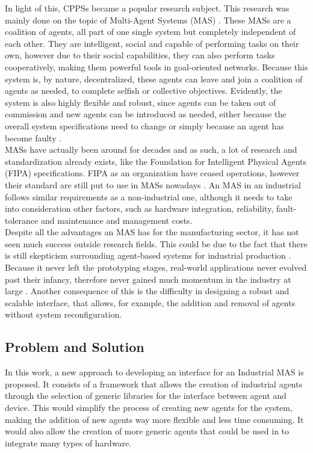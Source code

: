 In light of this, CPPSs became a popular research subject. This research was mainly done on the topic of Multi-Agent Systems (MAS) \cite{sakurada01} \cite{karnouskos01}. These MASs are a coalition of agents, all part of one single system but completely independent of each other. They are intelligent, social and capable of performing tasks on their own, however due to their social capabilities, they can also perform tasks cooperatively, making them powerful tools in goal-oriented networks. Because this system is, by nature, decentralized, these agents can leave and join a coalition of agents as needed, to complete selfish or collective objectives. Evidently, the system is also highly flexible and robust, since agents can be taken out of commission and new agents can be introduced as needed, either because the overall system specifications need to change or simply because an agent has become faulty \cite{paulo02}. \\

MASs have actually been around for decades and as such, a lot of research and standardization already exists, like the Foundation for Intelligent Physical Agents (FIPA) specifications. FIPA as an organization have ceased operations, however their standard are still put to use in MASs nowadays \cite{FIPA_website}. An MAS in an industrial follows similar requirements as a non-industrial one, although it needs to take into consideration other factors, such as hardware integration, reliability, fault-tolerance and maintenance and management costs.\\

Despite all the advantages an MAS has for the manufacturing sector, it has not seen much success outside research fields. This could be due to the fact that there is still skepticism surrounding agent-based systems for industrial production \cite{bottling_plant_part2}. Because it never left the prototyping stages, real-world applications never evolved past their infancy, therefore never gained much momentum in the industry at large \cite{karnouskos02}. Another consequence of this is the difficulty in designing a robust and scalable interface, that allows, for example, the addition and removal of agents without system reconfiguration. %

\subsection{Problem and Solution}

In this work, a new approach to developing an interface for an Industrial MAS is proposed. It consists of a framework that allows the creation of industrial agents through the selection of generic libraries for the interface between agent and device. This would simplify the process of creating new agents for the system, making the addition of new agents way more flexible and less time consuming. It would also allow the creation of more generic agents that could be used in to integrate many types of hardware.